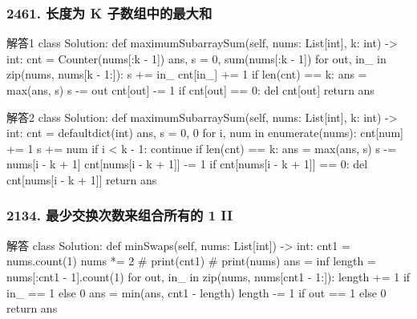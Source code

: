 \begin{frame}[fragile]          %
  \frametitle{\textsc{2461. 长度为 K 子数组中的最大和}}
  \begin{codeblock}[language=python]{解答1}
class Solution:
  def maximumSubarraySum(self, nums: List[int], k: int) -> int:
    cnt = Counter(nums[:k - 1])
    ans, s = 0, sum(nums[:k - 1])
    for out, in_ in zip(nums, nums[k - 1:]):
        s += in_
        cnt[in_] += 1
        if len(cnt) == k:
            ans = max(ans, s)
        s -= out
        cnt[out] -= 1
        if cnt[out] == 0:
            del cnt[out]
    return ans
  \end{codeblock}
\end{frame}


\begin{frame}[fragile]          %
  \begin{codeblock}[language=python]{解答2}
class Solution:
  def maximumSubarraySum(self, nums: List[int], k: int) -> int:
      cnt = defaultdict(int)
      ans, s = 0, 0
      for i, num in enumerate(nums):
          cnt[num] += 1
          s += num
          if i < k - 1:
              continue
          if len(cnt) == k:
              ans = max(ans, s)
          s -= nums[i - k + 1]
          cnt[nums[i - k + 1]] -= 1
          if cnt[nums[i - k + 1]] == 0:
              del cnt[nums[i - k + 1]]
      return ans
  \end{codeblock}
\end{frame}

\begin{frame}[fragile]          %
  \frametitle{\textsc{2134. 最少交换次数来组合所有的 1 II}}
  \begin{codeblock}[language=python]{解答}
class Solution:
  def minSwaps(self, nums: List[int]) -> int:
    cnt1 = nums.count(1)
    nums *= 2
    # print(cnt1)
    # print(nums)
    ans = inf
    length = nums[:cnt1 - 1].count(1)
    for out, in_ in zip(nums, nums[cnt1 - 1:]):
        length += 1 if in_ == 1 else 0
        ans = min(ans, cnt1 - length)
        length -= 1 if out == 1 else 0
    return ans
  \end{codeblock}
\end{frame}



